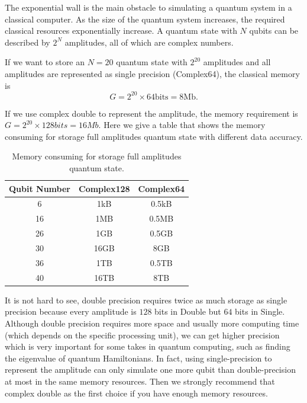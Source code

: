 The exponential wall is the main obstacle to simulating a quantum system in a classical computer.
As the size of the quantum system increases, the required classical resources exponentially increase.
A quantum state with $N$ qubits can be described by $2^N$ amplitudes, all of which are complex numbers.

If we want to store an $N=20$ quantum state with $2^{20}$ amplitudes and all amplitudes are represented as single precision (Complex64), the classical memory is
\begin{equation}
    G=2^{20}\times 64 \mathrm{bits} = 8 \mathrm{Mb}.
\end{equation}

If we use complex double to represent the amplitude, the memory requirement is $G=2^{20}\times 128 bits=16 Mb$. Here we give a table that shows the memory consuming for storage full amplitudes quantum state with different data accuracy.

\begin{table}[ht]
    \begin{tabular}{ccc}
        \toprule
        Qubit Number & Complex128 & Complex64 \\
        \midrule
        6            & 1kB        & 0.5kB     \\
        16           & 1MB        & 0.5MB     \\
        26           & 1GB        & 0.5GB     \\
        30           & 16GB       & 8GB       \\
        36           & 1TB        & 0.5TB     \\
        40           & 16TB       & 8TB       \\
        \bottomrule
    \end{tabular}
    \caption{Memory consuming for storage full amplitudes quantum state.}
    \label{tab:mem_consume}
\end{table}

It is not hard to see, double precision requires twice as much storage as single precision because every amplitude is $128$ bits in Double but $64$ bits in Single.
Although double precision requires more space and usually more computing time (which depends on the specific processing unit), we can get higher precision which is very important for some takes in quantum computing, such as finding the eigenvalue of quantum Hamiltonians.
In fact, using single-precision to represent the amplitude can only simulate one more qubit than double-precision at most in the same memory resources.
Then we strongly recommend that complex double as the first choice if you have enough memory resources.
